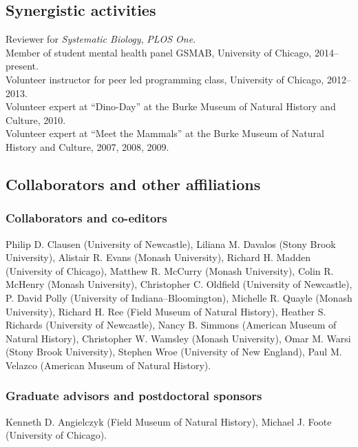 \documentclass[11pt,letterpaper]{article}
\begin{document}
\subsection{Synergistic activities}
Reviewer for \textit{Systematic Biology}, \textit{PLOS One}.\\
Member of student mental health panel GSMAB, University of Chicago, 2014--present.\\
Volunteer instructor for peer led programming class, University of Chicago, 2012--2013.\\
Volunteer expert at ``Dino-Day'' at the Burke Museum of Natural History and Culture, 2010. \\
Volunteer expert at ``Meet the Mammals'' at the Burke Museum of Natural History and Culture, 2007, 2008, 2009.

\subsection{Collaborators and other affiliations}
\subsubsection{Collaborators and co-editors}
Philip D. Clausen (University of Newcastle), Liliana M. Davalos (Stony Brook University), Alistair R. Evans (Monash University), Richard H. Madden (University of Chicago), Matthew R. McCurry (Monash University), Colin R. McHenry (Monash University), Christopher C. Oldfield (University of Newcastle), P. David Polly (University of Indiana--Bloomington), Michelle R. Quayle (Monash University), Richard H. Ree (Field Museum of Natural History), Heather S. Richards (University of Newcastle), Nancy B. Simmons (American Museum of Natural History), Christopher W. Wamsley (Monash University), Omar M. Warsi (Stony Brook University), Stephen Wroe (University of New England), Paul M. Velazco (American Museum of Natural History).

\subsubsection{Graduate advisors and postdoctoral sponsors}
Kenneth D. Angielczyk (Field Museum of Natural History), Michael J. Foote (University of Chicago).
\end{document}
